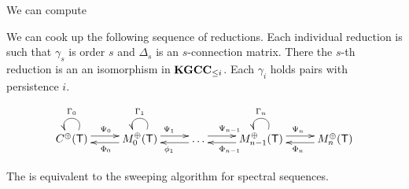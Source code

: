 We can compute 




We can cook up the following sequence of reductions.  Each individual reduction is such that $\gamma_s$ is order $s$ and $\Delta_s$ is an $s$-connection matrix.   There the $s$-th reduction is an an isomorphism in ${\bf KGCC}_{\leq i}$.  
Each $\gamma_i$ holds pairs with persistence $i$.


\[
\xymatrixrowsep{0.03in}
\xymatrixcolsep{0.35in}
\xymatrix{
C^\oplus(\sT)   \ar@(ur,ul)_{\Gamma_0} \ar[r]<3pt>^{\Psi_0} & \ar[l]<3pt>^{\Phi_0 } M_0^\oplus(\sT) \ar@(ur,ul)_{\Gamma_1} \ar[r]<3pt>^{\Psi_1} & \ar[l]<3pt>^{\phi_1 }  \ldots \ar[r]<3pt>^{\Psi_{n-1}}  & \ar[l]<3pt>^{\Phi_{n-1} }M_{n-1}^\oplus(\sT) \ar@(ur,ul)_{\Gamma_n}  \ar[r]<3pt>^{\Psi_n} & \ar[l]<3pt>^{\Phi_n} M_n^\oplus(\sT)
}
\]



\begin{rem}
The is equivalent to the sweeping algorithm for spectral sequences.
\end{rem}




%
%
%
%
%
%
%
%
%
%
%

%
%
%
%
%
%
